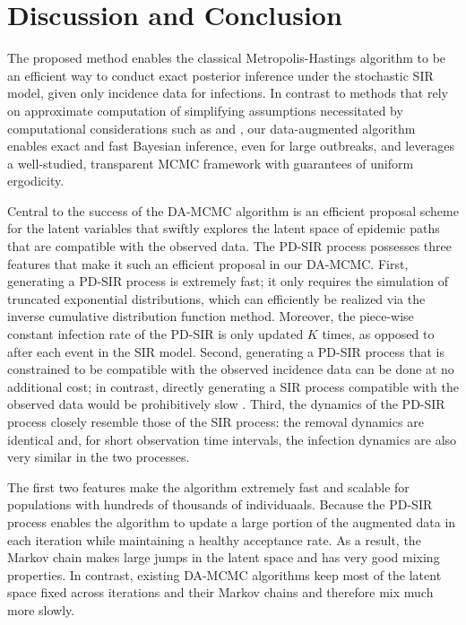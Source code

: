 \documentclass[12pt]{article}
\begin{document}
	\section{Discussion and Conclusion}
	\label{sec:dis}
	The proposed method enables the classical Metropolis-Hastings algorithm to be an efficient way to conduct exact posterior inference under the stochastic SIR model, given only incidence data for infections. %
	In contrast to methods that rely on approximate computation of simplifying assumptions necessitated by computational considerations such as \cite{McKinley.2018} and \cite{Fintzi.2020}, 
	our data-augmented algorithm enables exact and fast Bayesian inference, even for large outbreaks, and leverages a well-studied, transparent MCMC framework with  guarantees of uniform ergodicity.
	
	Central to the success of the DA-MCMC algorithm is an efficient proposal scheme for the latent variables that swiftly explores the latent space of epidemic paths that are compatible with the observed data. The PD-SIR process possesses three features that make it such an efficient proposal in our DA-MCMC. First, generating a PD-SIR process is extremely fast; it only requires the simulation of truncated exponential distributions, which can efficiently be realized via the inverse cumulative distribution function method. Moreover, the piece-wise constant infection rate of the PD-SIR is only updated $K$ times, as opposed to after each event in the SIR model. Second, generating a PD-SIR process that is constrained to be compatible with the observed incidence data can be done at no additional cost; in contrast, directly generating a SIR process compatible with the observed data would be prohibitively slow \citep{Hobolth.2009}. Third, the dynamics of the PD-SIR process closely resemble those of the SIR process: the removal dynamics are identical and, for short observation time intervals, the infection dynamics are also very similar in the two processes.
	
	The first two features make the algorithm extremely fast and scalable for populations with hundreds of thousands of individuaals. %
	Because the PD-SIR process enables the algorithm to update a large portion of the augmented data in each iteration while maintaining a healthy acceptance rate. As a result, the Markov chain makes large jumps in the latent space and has very good mixing properties. In contrast, existing DA-MCMC algorithms \citep{Gibson.1998, ONeill.1999, Fintzi.2017} keep most of the latent space fixed across iterations  and their Markov chains and therefore mix much more slowly.
	
\end{document}
